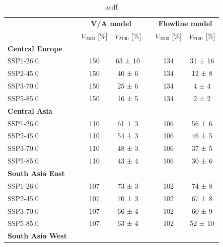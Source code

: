 
  \begin{table}[htp]
          \centering
          \small

          \caption{asdf}
          \label{tab:cmip}
          
          \begin{tabular}{@{}llcclcc@{}}
            \toprule
            {} & \phantom{a} & \multicolumn{2}{c}{\textbf{V/A model}} & \phantom{a} & \multicolumn{2}{c}{\textbf{{Flowline model}}} \\
            {} & \phantom{a} & $V_\text{2003}$ [\si{\percent}] & $V_\text{2100}$ [\si{\percent}] & & $V_\text{2003}$ [\si{\percent}] & $V_\text{2100}$ [\si{\percent}] \\
            \midrule
            \textbf{Central Europe}\\
            SSP1-26.0 & \phantom{a} & 150 & 63 ± 10 & \phantom{a} & 134 & 31 ± 16\\
            SSP2-45.0 & \phantom{a} & 150 & 40 ± 6 & \phantom{a} & 134 & 12 ± 8\\
            SSP3-70.0 & \phantom{a} & 150 & 25 ± 6 & \phantom{a} & 134 & 4 ± 4\\
            SSP5-85.0 & \phantom{a} & 150 & 16 ± 5 & \phantom{a} & 134 & 2 ± 2\\
            \textbf{Central Asia}\\
            SSP1-26.0 & \phantom{a} & 110 & 61 ± 3 & \phantom{a} & 106 & 56 ± 6\\
            SSP2-45.0 & \phantom{a} & 110 & 54 ± 3 & \phantom{a} & 106 & 46 ± 5\\
            SSP3-70.0 & \phantom{a} & 110 & 48 ± 3 & \phantom{a} & 106 & 37 ± 5\\
            SSP5-85.0 & \phantom{a} & 110 & 43 ± 4 & \phantom{a} & 106 & 30 ± 6\\
            \textbf{South Asia East}\\
            SSP1-26.0 & \phantom{a} & 107 & 73 ± 3 & \phantom{a} & 102 & 74 ± 8\\
            SSP2-45.0 & \phantom{a} & 107 & 70 ± 3 & \phantom{a} & 102 & 67 ± 8\\
            SSP3-70.0 & \phantom{a} & 107 & 66 ± 4 & \phantom{a} & 102 & 60 ± 9\\
            SSP5-85.0 & \phantom{a} & 107 & 63 ± 4 & \phantom{a} & 102 & 52 ± 10\\
            \textbf{South Asia West}\\

\end{tabular}
\end{table}
